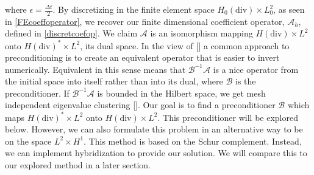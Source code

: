 \documentclass[11pt]{article}
\newcommand{\divv}{\mathrm{div}}
\begin{document}
where $\epsilon = \frac{\Delta t}{2}$.  By discretizing in the finite element space $H_0(\divv) \times L_0^2$, as seen in \eqref{FEcoeffoperator}, we recover our finite dimensional coefficient operator, $\mathscr{A}_h$, defined in \eqref{discretcoefop}.
We claim $\mathscr{A}$ is an isomorphism mapping  $H(\divv) \times L^2$ onto $H(\divv)^*\times L^2$, its dual space. In the view of [] a common approach to preconditioning is to create an equivalent operator that is easier to invert numerically. Equivalent in this sense means that $\mathscr{B}^{-1}\mathscr{A}$ is a nice operator from the initial space into itself rather than into its dual, where $\mathscr{B}$ is the preconditioner. If $\mathscr{B}^{-1}\mathscr{A}$ is bounded in the Hilbert space, we get mesh independent eigenvalue clustering []. Our goal is to find a preconditioner $\mathscr{B}$ which maps $H(\divv)^* \times L^2$ onto $H(\divv) \times L^2$. This preconditioner will be explored below. However, we can also formulate this problem in an alternative way to be on the space $L^2 \times H^1$. This method is based on the Schur complement.
Instead, we can implement hybridization to provide our solution. We will compare this to our explored method in a later section.
\end{document}
